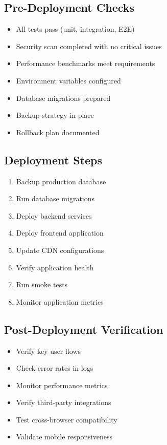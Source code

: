 \documentclass[12pt,a4paper]{article}
\begin{document}
\subsection{Pre-Deployment Checks}
\begin{itemize}
    \item All tests pass (unit, integration, E2E)
    \item Security scan completed with no critical issues
    \item Performance benchmarks meet requirements
    \item Environment variables configured
    \item Database migrations prepared
    \item Backup strategy in place
    \item Rollback plan documented
\end{itemize}

\subsection{Deployment Steps}
\begin{enumerate}
    \item Backup production database
    \item Run database migrations
    \item Deploy backend services
    \item Deploy frontend application
    \item Update CDN configurations
    \item Verify application health
    \item Run smoke tests
    \item Monitor application metrics
\end{enumerate}

\subsection{Post-Deployment Verification}
\begin{itemize}
    \item Verify key user flows
    \item Check error rates in logs
    \item Monitor performance metrics
    \item Verify third-party integrations
    \item Test cross-browser compatibility
    \item Validate mobile responsiveness
\end{itemize}
\end{document}
